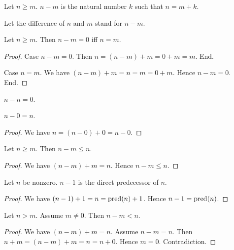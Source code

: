 \documentclass[../../arithmetic.ftl.tex]{subfiles}
\begin{document}
  \begin{forthel}
    \begin{definition}
      Let $n \geq m$.
      $n - m$ is the natural number $k$ such that $n = m + k$.
    \end{definition}

    Let the difference of $n$ and $m$ stand for $n - m$.

    \begin{proposition}\label{Arithmetic_02_07_297505}
      Let $n \geq m$.
      Then $n - m = 0$ iff $n = m$.
    \end{proposition}
    \begin{proof}
      Case $n - m = 0$.
        Then $n = (n - m) + m = 0 + m = m$.
      End.

      Case $n = m$.
        We have $(n - m) + m = n = m = 0 + m$.
        Hence $n - m = 0$.
      End.
    \end{proof}

    \begin{corollary}\label{Arithmetic_02_07_239083}
      $n - n = 0$.
    \end{corollary}

    \begin{proposition}\label{Arithmetic_02_07_151829}
      $n - 0 = n$.
    \end{proposition}
    \begin{proof}
      We have $n = (n - 0) + 0 = n - 0$.
    \end{proof}

    \begin{proposition}\label{Arithmetic_02_07_236650}
      Let $n \geq m$.
      Then $n - m \leq n$.
    \end{proposition}
    \begin{proof}
      We have $(n - m) + m = n$.
      Hence $n - m \leq n$.
    \end{proof}

    \begin{proposition}\label{Arithmetic_02_07_554898}
      Let $n$ be nonzero.
      $n - 1$ is the direct predecessor of $n$.
    \end{proposition}
    \begin{proof}
      We have $(n - 1) + 1 = n = \operatorname{pred}(n) + 1$.
      Hence $n - 1 = \operatorname{pred}(n)$.
    \end{proof}

    \begin{proposition}\label{Arithmetic_02_07_654395}
      Let $n > m$.
      Assume $m \neq 0$.
      Then $n - m < n$.
    \end{proposition}
    \begin{proof}
      We have $(n - m) + m = n$.
      Assume $n - m = n$.
      Then $n + m = (n - m) + m = n = n + 0$.
      Hence $m = 0$.
      Contradiction.
    \end{proof}


\end{forthel}
\end{document}
